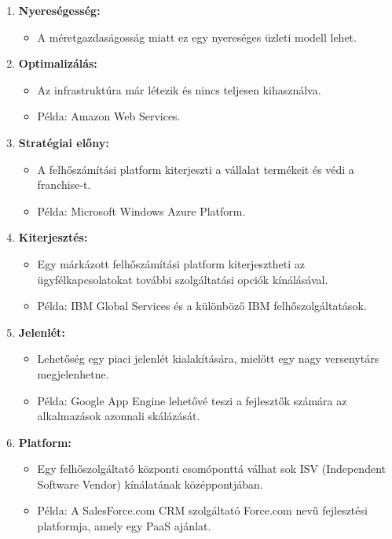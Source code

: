 \documentclass[a4paper,12pt]{article}
\begin{document}
    \begin{enumerate}
        \item \textbf{Nyereségesség:}
        \begin{itemize}
            \item A méretgazdaságosság miatt ez egy nyereséges üzleti modell lehet.
        \end{itemize}

        \item \textbf{Optimalizálás:}
        \begin{itemize}
            \item Az infrastruktúra már létezik és nincs teljesen kihasználva.
            \item Példa: Amazon Web Services.
        \end{itemize}

        \item \textbf{Stratégiai előny:}
        \begin{itemize}
            \item A felhőszámítási platform kiterjeszti a vállalat termékeit és védi a franchise-t.
            \item Példa: Microsoft Windows Azure Platform.
        \end{itemize}

        \item \textbf{Kiterjesztés:}
        \begin{itemize}
            \item Egy márkázott felhőszámítási platform kiterjesztheti az ügyfélkapcsolatokat további szolgáltatási opciók kínálásával.
            \item Példa: IBM Global Services és a különböző IBM felhőszolgáltatások.
        \end{itemize}

        \item \textbf{Jelenlét:}
        \begin{itemize}
            \item Lehetőség egy piaci jelenlét kialakítására, mielőtt egy nagy versenytárs megjelenhetne.
            \item Példa: Google App Engine lehetővé teszi a fejlesztők számára az alkalmazások azonnali skálázását.
        \end{itemize}

        \item \textbf{Platform:}
        \begin{itemize}
            \item Egy felhőszolgáltató központi csomóponttá válhat sok ISV (Independent Software Vendor) kínálatának középpontjában.
            \item Példa: A SalesForce.com CRM szolgáltató Force.com nevű fejlesztési platformja, amely egy PaaS ajánlat.
        \end{itemize}
    \end{enumerate}
\end{document}
